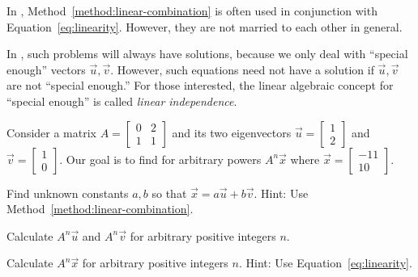 \documentclass[../main.tex]{subfiles}
\begin{document}
\faStar{} In \thiscourse, Method~\ref{method:linear-combination} is often used in conjunction with Equation~\ref{eq:linearity}. However, they are not married to each other in general. 

{\footnotesize \faExclamationTriangle{} In \thiscourse{}, such problems will always have solutions, because we only deal with ``special enough'' vectors \(\vec{u}, \vec{v}\). However, such equations need not have a solution if \(\vec{u}, \vec{v}\) are not ``special enough.'' For those interested, the linear algebraic concept for ``special enough'' is called \emph{linear independence}.}
\clearpage

Consider a matrix \(A = \begin{bmatrix} 0 & 2 \\ 1 & 1 \end{bmatrix}\) and its two eigenvectors \(\vec{u} = \begin{bmatrix} 1 \\ 2 \end{bmatrix}\) and \(\vec{v} = \begin{bmatrix} 1 \\ 0 \end{bmatrix}\).  Our goal is to find  for arbitrary powers \(A^{n} \vec{x}\) where \(\vec{x} = \begin{bmatrix} -11 \\ 10 \end{bmatrix}\).

\begin{example} \label{ex:linear-combination}
  Find unknown constants \(a,b\) so that \(\vec{x} = a \vec{u} + b \vec{v}\). Hint: Use Method~\ref{method:linear-combination}.

\end{example}

\begin{example}
  Calculate \(A^{n} \vec{u}\) and \(A^{n} \vec{v}\) for arbitrary positive integers \(n\). 

\end{example}

\begin{example}
  Calculate \(A^{n} \vec{x}\) for arbitrary positive integers \(n\). Hint: Use Equation~\eqref{eq:linearity}.

\end{example}
\clearpage
\end{document}
